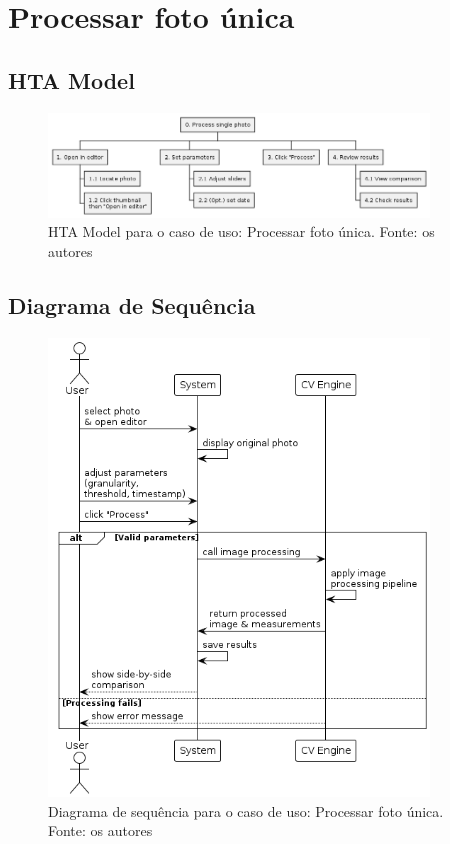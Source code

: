 \section{Processar foto única}

\subsection{HTA Model}

\begin{figure}[H]
    \centering
    \includegraphics[width=0.9\textwidth]{../figures/hta/UC011.png}
    \caption{HTA Model para o caso de uso: Processar foto única. Fonte: os autores}
    \label{fig:hta-uc011}
\end{figure}

\subsection{Diagrama de Sequência}

\begin{figure}[H]
    \centering
    \includegraphics[width=0.9\textwidth]{../figures/dss/UC011.png}
    \caption{Diagrama de sequência para o caso de uso: Processar foto única. Fonte: os autores}
    \label{fig:dss-uc011}
\end{figure}


